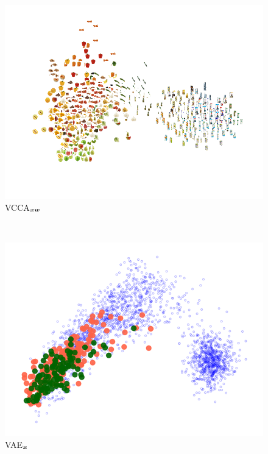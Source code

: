 \begin{subfigure}[b]{0.3\textwidth}
	\centering
	\includegraphics[width=\textwidth]{Chapter1/pics_paperB/pca_latents_vcca_xw_seed2}
	\vspace{-8mm}
	\caption{VCCA$_{{\bm{x}}{\bm{w}}}$}
\label{fig:pca_latents_vcca_xw}
\end{subfigure} \\ 
\begin{subfigure}[b]{0.3\textwidth}
	\centering
	\includegraphics[width=\textwidth]{Chapter1/pics_paperB/pca_latents_apples_vae_seed2}
	\vspace{-8mm}
	\caption{VAE$_{{\bm{x}}}$}
\label{fig:pca_latents_vae_apples}
\end{subfigure}
\hfill
